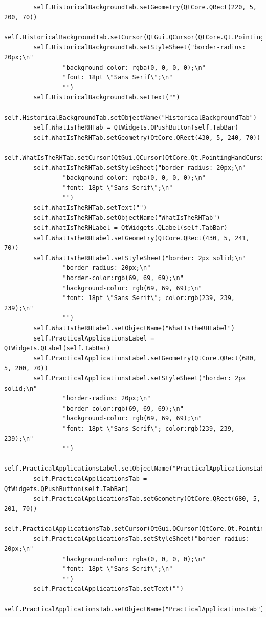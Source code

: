 \documentclass{article}
\begin{document}
\begin{lstlisting}
        self.HistoricalBackgroundTab.setGeometry(QtCore.QRect(220, 5, 200, 70))
        self.HistoricalBackgroundTab.setCursor(QtGui.QCursor(QtCore.Qt.PointingHandCursor))
        self.HistoricalBackgroundTab.setStyleSheet("border-radius: 20px;\n"
                "background-color: rgba(0, 0, 0, 0);\n"
                "font: 18pt \"Sans Serif\";\n"
                "")
        self.HistoricalBackgroundTab.setText("")
        self.HistoricalBackgroundTab.setObjectName("HistoricalBackgroundTab")
        self.WhatIsTheRHTab = QtWidgets.QPushButton(self.TabBar)
        self.WhatIsTheRHTab.setGeometry(QtCore.QRect(430, 5, 240, 70))
        self.WhatIsTheRHTab.setCursor(QtGui.QCursor(QtCore.Qt.PointingHandCursor))
        self.WhatIsTheRHTab.setStyleSheet("border-radius: 20px;\n"
                "background-color: rgba(0, 0, 0, 0);\n"
                "font: 18pt \"Sans Serif\";\n"
                "")
        self.WhatIsTheRHTab.setText("")
        self.WhatIsTheRHTab.setObjectName("WhatIsTheRHTab")
        self.WhatIsTheRHLabel = QtWidgets.QLabel(self.TabBar)
        self.WhatIsTheRHLabel.setGeometry(QtCore.QRect(430, 5, 241, 70))
        self.WhatIsTheRHLabel.setStyleSheet("border: 2px solid;\n"
                "border-radius: 20px;\n"
                "border-color:rgb(69, 69, 69);\n"
                "background-color: rgb(69, 69, 69);\n"
                "font: 18pt \"Sans Serif\"; color:rgb(239, 239, 239);\n"
                "")
        self.WhatIsTheRHLabel.setObjectName("WhatIsTheRHLabel")
        self.PracticalApplicationsLabel = QtWidgets.QLabel(self.TabBar)
        self.PracticalApplicationsLabel.setGeometry(QtCore.QRect(680, 5, 200, 70))
        self.PracticalApplicationsLabel.setStyleSheet("border: 2px solid;\n"
                "border-radius: 20px;\n"
                "border-color:rgb(69, 69, 69);\n"
                "background-color: rgb(69, 69, 69);\n"
                "font: 18pt \"Sans Serif\"; color:rgb(239, 239, 239);\n"
                "")
        self.PracticalApplicationsLabel.setObjectName("PracticalApplicationsLabel")
        self.PracticalApplicationsTab = QtWidgets.QPushButton(self.TabBar)
        self.PracticalApplicationsTab.setGeometry(QtCore.QRect(680, 5, 201, 70))
        self.PracticalApplicationsTab.setCursor(QtGui.QCursor(QtCore.Qt.PointingHandCursor))
        self.PracticalApplicationsTab.setStyleSheet("border-radius: 20px;\n"
                "background-color: rgba(0, 0, 0, 0);\n"
                "font: 18pt \"Sans Serif\";\n"
                "")
        self.PracticalApplicationsTab.setText("")
        self.PracticalApplicationsTab.setObjectName("PracticalApplicationsTab")

\end{lstlisting}
\end{document}
